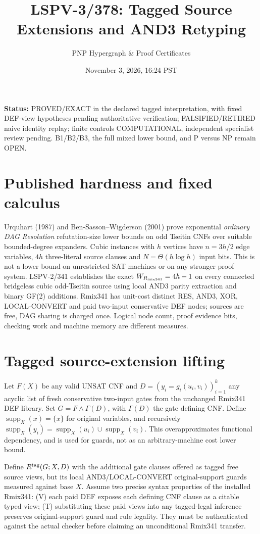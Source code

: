 \documentclass[11pt]{article}
\title{LSPV-3/378: Tagged Source Extensions and AND3 Retyping}
\author{PNP Hypergraph \& Proof Certificates}
\date{November 3, 2026, 16:24 PST}
\begin{document}
\maketitle
\noindent\textbf{Status:} PROVED/EXACT in the declared tagged interpretation, with fixed DEF-view hypotheses pending authoritative verification; FALSIFIED/RETIRED naive identity replay; finite controls COMPUTATIONAL, independent specialist review pending. B1/B2/B3, the full mixed lower bound, and P versus NP remain OPEN.

\section*{Published hardness and fixed calculus}
Urquhart (1987) and Ben-Sasson--Wigderson (2001) prove exponential \emph{ordinary DAG Resolution} refutation-size lower bounds on odd Tseitin CNFs over suitable bounded-degree expanders. Cubic instances with $h$ vertices have $n=3h/2$ edge variables, $4h$ three-literal source clauses and $N=\Theta(h\log h)$ input bits. This is not a lower bound on unrestricted SAT machines or on any stronger proof system. LSPV-2/341 establishes the exact $W_{R_{\rm mix341}}=4h-1$ on every connected bridgeless cubic odd-Tseitin source using local AND3 parity extraction and binary GF(2) additions. Rmix341 has unit-cost distinct RES, AND3, XOR, LOCAL-CONVERT and paid two-input conservative DEF nodes; sources are free, DAG sharing is charged once. Logical node count, proof evidence bits, checking work and machine memory are different measures.

\section*{Tagged source-extension lifting}
Let $F(X)$ be any valid UNSAT CNF and $D=(y_i=g_i(u_i,v_i))_{i=1}^{k}$ any acyclic list of fresh conservative two-input gates from the unchanged Rmix341 DEF library. Set $G=F\wedge\Gamma(D)$, with $\Gamma(D)$ the gate defining CNF. Define $\operatorname{supp}_X(x)=\{x\}$ for original variables, and recursively $\operatorname{supp}_X(y_i)=\operatorname{supp}_X(u_i)\cup\operatorname{supp}_X(v_i)$. This overapproximates functional dependency, and is used for guards, not as an arbitrary-machine cost lower bound.

Define $R^{\rm tag}(G;X,D)$ with the additional gate clauses offered as tagged free source views, but its local AND3/LOCAL-CONVERT original-support guards measured against base $X$. Assume two precise syntax properties of the installed Rmix341: (V) each paid DEF exposes each defining CNF clause as a citable typed view; (T) substituting these paid views into any tagged-legal inference preserves original-support guard and rule legality. They must be authenticated against the actual checker before claiming an unconditional Rmix341 transfer.
\end{document}
